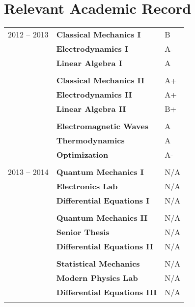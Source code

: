 \documentclass[15pt]{tccv}
\begin{document}
\section{Relevant Academic Record} 
\begin{tabular}{rl|l}

2012 -- 2013 & \textbf{Classical Mechanics I} & \textsc{B} \\
             & \textbf{Electrodynamics I} & \textsc{A-} \\
             & \textbf{Linear Algebra I} & \textsc{A} \\ \\
             
             & \textbf{Classical Mechanics II} & \textsc{A+} \\
             & \textbf{Electrodynamics II} & \textsc{A+} \\
             & \textbf{Linear Algebra II} & \textsc{B+} \\ \\
             
             & \textbf{Electromagnetic Waves} & \textsc{A} \\
             & \textbf{Thermodynamics} & \textsc{A} \\
             & \textbf{Optimization} & \textsc{A-} \\ \\
             
2013 -- 2014 & \textbf{Quantum Mechanics I} & \textsc{N/A} \\
             & \textbf{Electronics Lab} & \textsc{N/A} \\
             & \textbf{Differential Equations I} & \textsc{N/A} \\ \\
             
             & \textbf{Quantum Mechanics II} & \textsc{N/A} \\
             & \textbf{Senior Thesis} & \textsc{N/A} \\
             & \textbf{Differential Equations II} & \textsc{N/A} \\ \\
             
             & \textbf{Statistical Mechanics} & \textsc{N/A} \\
             & \textbf{Modern Physics Lab} & \textsc{N/A} \\
             & \textbf{Differential Equations III} & \textsc{N/A} \\ \\
             

\end{tabular}
\end{document}
